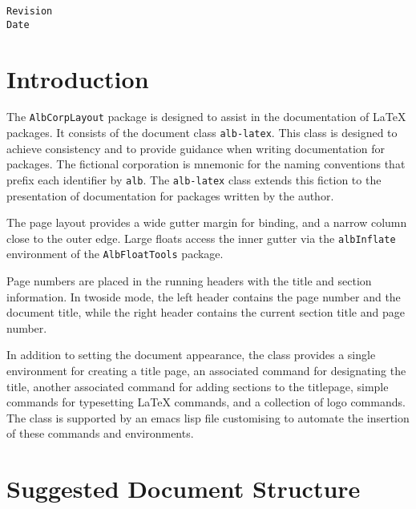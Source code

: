 \documentclass[11pt,a4paper,oneside,titlepage]{alb-latex}
\begin{document}
\begin{albTitlePage}

  \verb$Revision$\\
  \verb$Date$

\end{albTitlePage}




\section{Introduction}
\label{sec:alb-latex:intr}

The \texttt{AlbCorpLayout} package is designed to assist in the
documentation of \LaTeX{} packages.  It consists of the document class
\texttt{alb-latex}.  This class is designed to achieve consistency and to
provide guidance when writing documentation for \albLogo{} packages.
The fictional \albLogo{} corporation is mnemonic for the naming
conventions that prefix each identifier by \texttt{alb}.  The
\texttt{alb-latex} class extends this fiction to the presentation of
documentation for packages written by the author.

The page layout provides a wide gutter margin for binding, and a narrow
column close to the outer edge.  Large floats access the inner gutter
via the \texttt{albInflate} environment of the \texttt{AlbFloatTools}
package.

Page numbers are placed in the running headers with the title and
section information.  In twoside mode, the left header contains the page
number and the document title, while the right header contains the
current section title and page number.

In addition to setting the document appearance, the class provides a
single environment for creating a title page, an associated command for
designating the title, another associated command for adding sections to
the titlepage, simple commands for typesetting \LaTeX{} commands, and a
collection of logo commands.  The class is supported by an emacs lisp
file customising \AUCTeX{} to automate the insertion of these commands
and environments.




\section{Suggested Document Structure}
\label{sec:alb-latex:sugg-docum-struct}
\end{document}
